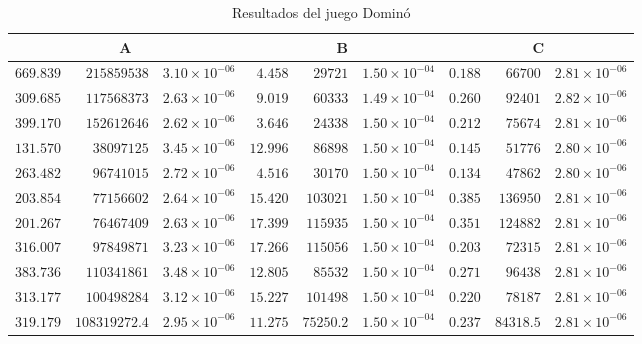 \begin{table}[ht]
   \scriptsize
    \centering
    \begin{tabular}{r r r | r r r | r r r}
    \multicolumn{3}{c}{A} & \multicolumn{3}{c}{B} & \multicolumn{3}{c}{C} \\ \hline
	$669.839$ & $215859538$ & $3.10 {\times} 10^{-06}$ & $4.458$ & $29721$ & $1.50 {\times} 10^{-04}$ & $0.188$ & $66700$ & $2.81 {\times} 10^{-06}$ \\
	$309.685$ & $117568373$ & $2.63 {\times} 10^{-06}$ & $9.019$ & $60333$ & $1.49 {\times} 10^{-04}$ & $0.260$ & $92401$ & $2.82 {\times} 10^{-06}$ \\
	$399.170$ & $152612646$ & $2.62 {\times} 10^{-06}$ & $3.646$ & $24338$ & $1.50 {\times} 10^{-04}$ & $0.212$ & $75674$ & $2.81 {\times} 10^{-06}$ \\
	$131.570$ & $38097125$ & $3.45 {\times} 10^{-06}$ & $12.996$ & $86898$ & $1.50 {\times} 10^{-04}$ & $0.145$ & $51776$ & $2.80 {\times} 10^{-06}$ \\
	$263.482$ & $96741015$ & $2.72 {\times} 10^{-06}$ & $4.516$ & $30170$ & $1.50 {\times} 10^{-04}$ & $0.134$ & $47862$ & $2.80 {\times} 10^{-06}$ \\
	$203.854$ & $77156602$ & $2.64 {\times} 10^{-06}$ & $15.420$ & $103021$ & $1.50 {\times} 10^{-04}$ & $0.385$ & $136950$ & $2.81 {\times} 10^{-06}$ \\
	$201.267$ & $76467409$ & $2.63 {\times} 10^{-06}$ & $17.399$ & $115935$ & $1.50 {\times} 10^{-04}$ & $0.351$ & $124882$ & $2.81 {\times} 10^{-06}$ \\
	$316.007$ & $97849871$ & $3.23 {\times} 10^{-06}$ & $17.266$ & $115056$ & $1.50 {\times} 10^{-04}$ & $0.203$ & $72315$ & $2.81 {\times} 10^{-06}$ \\
	$383.736$ & $110341861$ & $3.48 {\times} 10^{-06}$ & $12.805$ & $85532$ & $1.50 {\times} 10^{-04}$ & $0.271$ & $96438$ & $2.81 {\times} 10^{-06}$ \\
	$313.177$ & $100498284$ & $3.12 {\times} 10^{-06}$ & $15.227$ & $101498$ & $1.50 {\times} 10^{-04}$ & $0.220$ & $78187$ & $2.81 {\times} 10^{-06}$ \\ \hline
	$319.179$ & $108319272.4$ & $2.95 {\times} 10^{-06}$ & $11.275$ & $75250.2$ & $1.50 {\times} 10^{-04}$ & $0.237$ & $84318.5$ & $2.81 {\times} 10^{-06}$ \\ \hline
    \end{tabular}
    \caption{Resultados del juego Dominó}
    \label{tab:resultados-domino}
\end{table}

